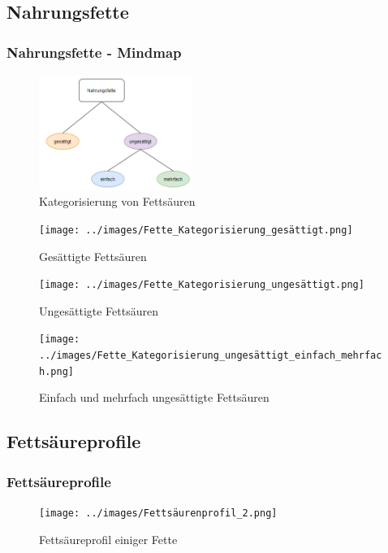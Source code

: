 \documentclass[xcolor=dvipsnames]{beamer}
\begin{document}
    \subsection{Nahrungsfette}
    \begin{frame}[allowframebreaks]
        \frametitle{Nahrungsfette - Mindmap}
        \begin{figure}{}
            \centering
            \includegraphics[width=5cm]{../images/Fette_Kategorisierung.png}
            \caption{Kategorisierung von Fettsäuren}
        \end{figure}

        \framebreak

        \begin{figure}
            \centering
            \texttt{[image: ../images/Fette\_Kategorisierung\_gesättigt.png]}
            \caption{Gesättigte Fettsäuren}
        \end{figure}

        \framebreak

        \begin{figure}
            \centering
            \texttt{[image: ../images/Fette\_Kategorisierung\_ungesättigt.png]}
            \caption{Ungesättigte Fettsäuren}
        \end{figure}

        \framebreak

        \begin{figure}
            \centering
            \texttt{[image: ../images/Fette\_Kategorisierung\_ungesättigt\_einfach\_mehrfach.png]}
            \caption{Einfach und mehrfach ungesättigte Fettsäuren}
        \end{figure}
    \end{frame}

    \subsection{Fettsäureprofile}
    \begin{frame}
        \frametitle{Fettsäureprofile}

        \begin{figure}
            \centering
            \texttt{[image: ../images/Fettsäurenprofil\_2.png]}
            \caption{Fettsäureprofil einiger Fette}
        \end{figure}
    \end{frame}
\end{document}
